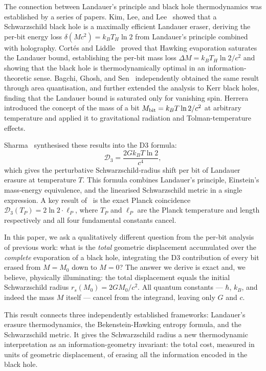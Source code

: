 \documentclass[aps,prd,twocolumn,showpacs,preprintnumbers,amsmath,amssymb,longbibliography]{revtex4-2}
\begin{document}
The connection between Landauer's principle and black hole thermodynamics was established 
by a series of papers. Kim, Lee, and Lee~\cite{kim2010} showed that a Schwarzschild black 
hole is a maximally efficient Landauer eraser, deriving the per-bit energy loss 
$\delta(Mc^2) = k_B T_H \ln 2$ from Landauer's principle combined with holography. 
Cort\'es and Liddle~\cite{cortes2025} proved that Hawking evaporation saturates the 
Landauer bound, establishing the per-bit mass loss $\Delta M = k_B T_H \ln 2/c^2$ and 
showing that the black hole is thermodynamically optimal in an information-theoretic sense. 
Bagchi, Ghosh, and Sen~\cite{bagchi2024} independently obtained the same result through 
area quantisation, and further extended the analysis to Kerr black holes, finding that 
the Landauer bound is saturated only for vanishing spin. Herrera~\cite{herrera2020} 
introduced the concept of the mass of a bit $M_{\rm bit} = k_B T \ln 2/c^2$ at arbitrary 
temperature and applied it to gravitational radiation and Tolman-temperature effects.

Sharma~\cite{sharma2026d3} synthesised these results into the D3 formula:
\begin{equation}
\mathcal{D}_3 = \frac{2G k_B T \ln 2}{c^4},
\label{eq:d3_general}
\end{equation}
which gives the perturbative Schwarzschild-radius shift per bit of Landauer erasure at 
temperature $T$. This formula combines Landauer's principle, Einstein's mass-energy 
equivalence, and the linearised Schwarzschild metric in a single expression. A key result 
of~\cite{sharma2026d3} is the exact Planck coincidence 
$\mathcal{D}_3(T_P) = 2\ln 2 \cdot \ell_P$, where $T_P$ and $\ell_P$ are the Planck 
temperature and length respectively and all four fundamental constants cancel.

In this paper, we ask a qualitatively different question from the per-bit analysis of 
previous work: what is the \emph{total} geometric displacement accumulated over the 
\emph{complete} evaporation of a black hole, integrating the D3 contribution of every 
bit erased from $M = M_0$ down to $M = 0$? The answer we derive is exact and, we believe, 
physically illuminating: the total displacement equals the initial Schwarzschild radius 
$r_s(M_0) = 2GM_0/c^2$. All quantum constants --- $\hbar$, $k_B$, and indeed the mass 
$M$ itself --- cancel from the integrand, leaving only $G$ and $c$.

This result connects three independently established frameworks: Landauer's erasure 
thermodynamics, the Bekenstein-Hawking entropy formula, and the Schwarzschild metric. 
It gives the Schwarzschild radius a new thermodynamic interpretation as an 
information-geometry invariant: the total cost, measured in units of geometric 
displacement, of erasing all the information encoded in the black hole. 
\end{document}
